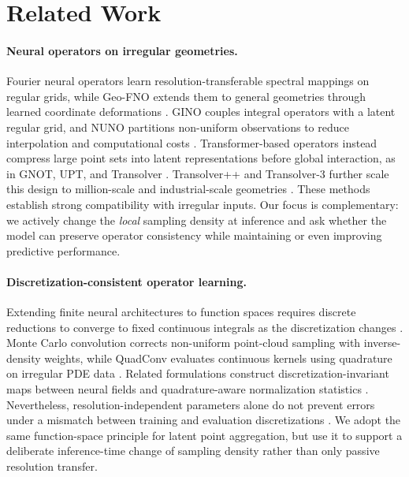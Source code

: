 \documentclass{article}
\begin{document}
\section{Related Work}
\paragraph{Neural operators on irregular geometries.}
Fourier neural operators learn resolution-transferable spectral mappings on
regular grids, while Geo-FNO extends them to general geometries through learned
coordinate deformations \citep{li2021fno,li2023geofno}. GINO couples integral
operators with a latent regular grid, and NUNO partitions non-uniform
observations to reduce interpolation and computational costs
\citep{li2023gino,liu2023nuno}. Transformer-based operators instead compress
large point sets into latent representations before global interaction, as in
GNOT, UPT, and Transolver \citep{hao2023gnot,alkin2024upt,wu2024transolver}.
Transolver++ and Transolver-3 further scale this design to million-scale and
industrial-scale geometries \citep{luo2025transolverpp,zhou2026transolver3}.
These methods establish strong compatibility with irregular inputs. Our focus is complementary: we actively change the \emph{local} sampling density at inference and ask whether the model can preserve operator consistency while maintaining or even improving predictive performance.
\vspace{-1em}
\paragraph{Discretization-consistent operator learning.}
Extending finite neural architectures to function spaces requires discrete
reductions to converge to fixed continuous integrals as the discretization
changes \citep{berner2026functionspaces}. Monte Carlo convolution corrects
non-uniform point-cloud sampling with inverse-density weights, while QuadConv
evaluates continuous kernels using quadrature on irregular PDE data
\citep{hermosilla2018montecarlo,doherty2024quadconv}. Related formulations
construct discretization-invariant maps between neural fields and
quadrature-aware normalization statistics \citep{wang2022din,kim2026quadnorm}.
Nevertheless, resolution-independent parameters alone do not prevent errors
under a mismatch between training and evaluation discretizations
\citep{gao2025discretization}. We adopt the same function-space principle for
latent point aggregation, but use it to support a deliberate inference-time
change of sampling density rather than only passive resolution transfer.
\vspace{-1em}
\end{document}
